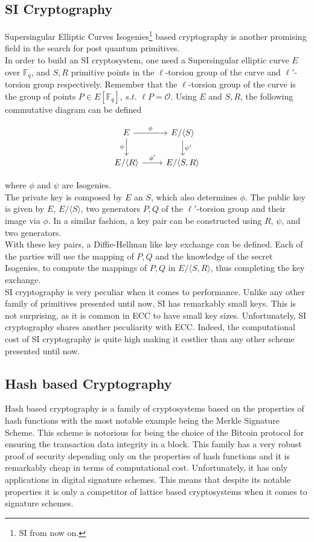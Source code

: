 \subsection{SI Cryptography}
Supersingular Elliptic Curves Isogenies\footnote{SI from now on.} based cryptography is another promising field in the search for post quantum primitives.\\
In order to build an SI cryptosystem, one need a Supersingular elliptic curve $E$ over $\mathbb{F}_q$, and $S,R$ primitive points in the $\ell$-torsion group of the curve and $\ell'$-torsion group respectively. Remember that the $\ell$-torsion group of the curve is the group of points $P\in E[\mathbb{F}_q]$, $s.t.$ $\ell P=\mathscr{O}$. Using $E$ and $S,R$, the following commutative diagram can be defined

\[\begin{tikzcd}
E \arrow{r}{\phi} \arrow[swap]{d}{\psi} & E/\langle S \rangle \arrow{d}{\psi'} \\
E/\langle R \rangle \arrow{r}{\phi'} & E/\langle S,R \rangle
\end{tikzcd}
\]

where $\phi$ and $\psi$ are Isogenies.\\
The private key is composed by $E$ an $S$, which also determines $\phi$. The public key is given by $E$, $E/\langle S \rangle$, two generators $P,Q$ of the $\ell'$-torsion group and their image via $\phi$. In a similar fashion, a key pair can be constructed using $R$, $\psi$, and two generators.\\
With these key pairs, a Diffie-Hellman like key exchange can be defined. Each of the parties will use the mapping of $P,Q$ and the knowledge of the secret Isogenies, to compute the mappings of $P,Q$ in $E/\langle S,R \rangle$, thus completing the key exchange.\\
SI cryptography is very peculiar when it comes to performance. Unlike any other family of primitives presented until now, SI has remarkably small keys. This is not surprising, as it is common in ECC to have small key sizes. Unfortunately, SI cryptography shares another peculiarity with ECC. Indeed, the computational cost of SI cryptography is quite high making it costlier than any other scheme presented until now. 

\subsection{Hash based Cryptography}
Hash based cryptography is a family of cryptosystems based on the properties of hash functions with the most notable example being the Merkle Signature Scheme. This scheme is notorious for being the choice of the Bitcoin protocol for ensuring the transaction data integrity in a block. This family has a very robust proof of security depending only on the properties of hash functions and it is remarkably cheap in terms of computational cost. Unfortunately, it has only applications in digital signature schemes. This means that despite its notable properties it is only a competitor of lattice based cryptosystems when it comes to signature schemes.